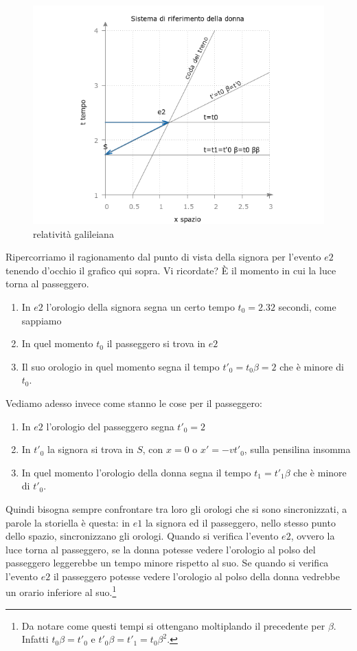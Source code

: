 \begin{figure}[h!]
 \centering
 \includegraphics[scale=0.7]{figure/fig12}
 \caption{relatività galileiana}
\end{figure}

Ripercorriamo il ragionamento dal punto di vista  della signora per l'evento $e2$ tenendo d'occhio il grafico qui sopra. Vi ricordate? È il momento in cui la luce torna al passeggero.

\begin{enumerate}
 \item In $e2$ l'orologio della signora segna un certo tempo $t_0=2.32$ secondi, come sappiamo
 \item In quel momento $t_0$ il passeggero si trova in $e2$
 \item Il suo orologio in quel momento segna il tempo $t'_0 =t_0\beta=2$ che è minore di $t_0$.
\end{enumerate}

Vediamo adesso invece come stanno le cose per il passeggero:

\begin{enumerate}
 \item In $e2$ l'orologio del passeggero segna $t'_0=2$ 
 \item In $t'_0$ la signora si trova in $S$, con $x=0$ o $x'=-vt'_0$, sulla pensilina insomma
 \item In quel momento l'orologio della donna segna il tempo $t_1 =t'_1\beta$ che è minore di $t'_0$.
\end{enumerate}

Quindi bisogna sempre confrontare tra loro gli orologi che si sono sincronizzati, a parole la storiella è questa: in $e1$ la signora ed il passeggero, nello stesso punto dello spazio, sincronizzano gli orologi. Quando si verifica l'evento $e2$, ovvero la luce torna al passeggero, se la donna potesse vedere l'orologio al polso del passeggero leggerebbe un tempo minore rispetto al suo. Se quando si verifica l'evento $e2$ il passeggero potesse vedere l'orologio al polso della donna vedrebbe un orario inferiore al suo.\footnote{Da notare come questi tempi si ottengano moltiplando il precedente per $\beta$. Infatti $t_0 \beta= t'_0$ e $t'_0 \beta= t'_1 = t_0 \beta^2$. }


